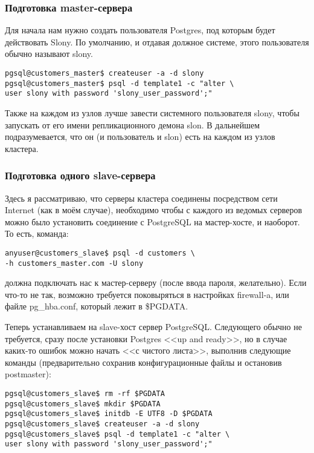 \subsubsection{Подготовка master-сервера}
Для начала нам нужно создать пользователя Postgres, под которым будет действовать Slony.
По умолчанию, и отдавая должное системе, этого пользователя обычно называют slony.
\begin{lstlisting}[label=lst:slony2,caption=Подготовка master-сервера]
pgsql@customers_master$ createuser -a -d slony
pgsql@customers_master$ psql -d template1 -c "alter \
user slony with password 'slony_user_password';"
\end{lstlisting}

Также на каждом из узлов лучше завести системного пользователя slony, чтобы запускать от его имени
репликационного демона slon. В дальнейшем подразумевается, что он (и пользователь и slon) есть на
каждом из узлов кластера.

\subsubsection{Подготовка одного slave-сервера}
Здесь я рассматриваю, что серверы кластера соединены посредством сети Internet (как в моём случае), необходимо
чтобы с каждого из ведомых серверов можно было установить соединение с PostgreSQL на мастер-хосте, и наоборот.
То есть, команда:
\begin{lstlisting}[label=lst:slony3,caption=Подготовка одного slave-сервера]
anyuser@customers_slave$ psql -d customers \
-h customers_master.com -U slony
\end{lstlisting}

должна подключать нас к мастер-серверу (после ввода пароля, желательно). Если что-то не так, возможно требуется
поковыряться в настройках firewall-a, или файле pg\_hba.conf, который лежит в \$PGDATA.

Теперь устанавливаем на slave-хост сервер PostgreSQL. Следующего обычно не требуется, сразу после установки Postgres
<<up and ready>>, но в случае каких-то ошибок можно начать <<с чистого листа>>, выполнив следующие команды
(предварительно сохранив конфигурационные файлы и остановив postmaster):
\begin{lstlisting}[label=lst:slony4,caption=Подготовка одного slave-сервера]
pgsql@customers_slave$ rm -rf $PGDATA
pgsql@customers_slave$ mkdir $PGDATA
pgsql@customers_slave$ initdb -E UTF8 -D $PGDATA
pgsql@customers_slave$ createuser -a -d slony
pgsql@customers_slave$ psql -d template1 -c "alter \
user slony with password 'slony_user_password';"
\end{lstlisting}


